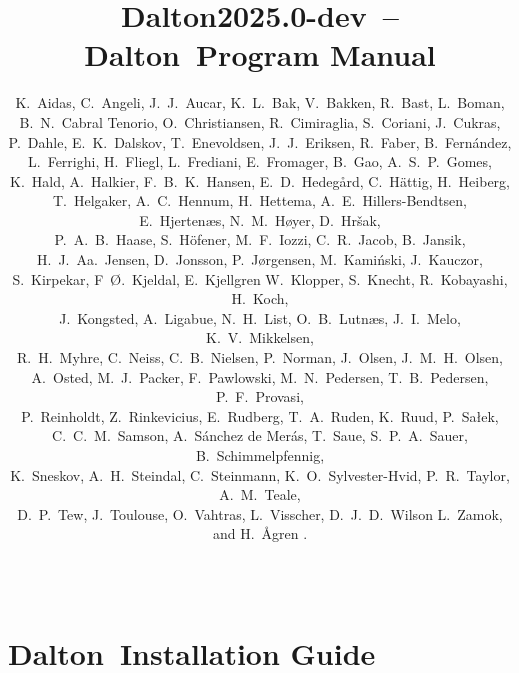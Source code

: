 \documentclass[11pt]{report}
\newcommand{\latestrelease}{Dalton2025.0-dev}
\newcommand{\dalton}{{\sc Dalton}}
\begin{document}
\nobibliography*
%
%
\baselineskip=15pt
%
\title{\latestrelease\ -- \dalton\ Program Manual}

%
\author{
K.~Aidas,
C.~Angeli,
J.~J.~Aucar,
K.~L.~Bak,
V.~Bakken,
R.~Bast,
L.~Boman,\\
B.~N.~Cabral Tenorio,
O.~Christiansen,
R.~Cimiraglia,
S.~Coriani,
J.~Cukras,\\
P.~Dahle,
E.~K.~Dalskov,
T.~Enevoldsen,
J.~J.~Eriksen,
R.~Faber,
B.~Fern\'{a}ndez,\\
L.~Ferrighi,
H.~Fliegl,
L.~Frediani,
E.~Fromager,
B.~Gao,
A.~S.~P.~Gomes,\\
K.~Hald,
A.~Halkier,
F.~B.~K.~Hansen,
E.~D.~Hedeg\aa{}rd,
C.~H{\"a}ttig,
H.~Heiberg,\\
T.~Helgaker,
A.~C.~Hennum,
H.~Hettema,
A.~E.~Hillers-Bendtsen,
E.~Hjerten\ae{}s,
N.~M.~H{\o}yer,
D.~Hr\v{s}ak,\\
P.~A.~B.~Haase,
S.~H{\"o}fener,
M.~F.~Iozzi,
C.~R.~Jacob,
B.~Jansik,\\
H.~J.~Aa.~Jensen,
D.~Jonsson,
P.~J{\o}rgensen,
M.~Kami{\'n}ski,
J.~Kauczor,\\
S.~Kirpekar,
F~{\O}.~Kjeldal,
E.~Kjellgren
W.~Klopper,
S.~Knecht,
R.~Kobayashi,
H.~Koch,\\
J.~Kongsted,
A.~Ligabue,
N.~H.~List,
O.~B.~Lutn\ae{}s,
J.~I.~Melo,
K.~V.~Mikkelsen,\\
R.~H.~Myhre,
C.~Neiss,
C.~B.~Nielsen,
P.~Norman,
J.~Olsen,
J.~M.~H.~Olsen,\\
A.~Osted,
M.~J.~Packer,
F.~Pawlowski,
M.~N.~Pedersen,
T.~B.~Pedersen,
P.~F.~Provasi,\\
P.~Reinholdt,
Z.~Rinkevicius,
E.~Rudberg,
T.~A.~Ruden,
K.~Ruud,
P.~Sa\l{}ek,\\
C.~C.~M.~Samson,
A.~S\'{a}nchez de Mer\'{a}s,
T.~Saue,
S.~P.~A.~Sauer,
B.~Schimmelpfennig,\\
K.~Sneskov,
A.~H.~Steindal,
C.~Steinmann,
K.~O.~Sylvester-Hvid,
P.~R.~Taylor,
A.~M.~Teale,\\
D.~P.~Tew,
J.~Toulouse,
O.~Vahtras,
L.~Visscher,
D.~J.~D.~Wilson
L.~Zamok,
and H.~{\AA}gren
.
}
%
\date{\mbox{\ }}
%
\maketitle
%



\part{\dalton\ Installation Guide}


\end{document}
